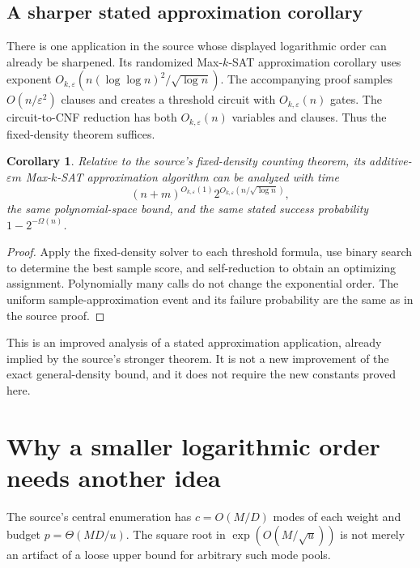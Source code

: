 \documentclass[11pt]{article}
\newtheorem{corollary}[theorem]{Corollary}
\theoremstyle{remark}
\begin{document}
\subsection{A sharper stated approximation corollary}

There is one application in the source whose displayed logarithmic order can already be sharpened. Its randomized Max-$k$-SAT approximation corollary uses exponent $O_{k,\varepsilon}(n(\log\log n)^2/\sqrt{\log n})$. The accompanying proof samples $O(n/\varepsilon^2)$ clauses and creates a threshold circuit with $O_{k,\varepsilon}(n)$ gates. The circuit-to-CNF reduction has both $O_{k,\varepsilon}(n)$ variables and clauses. Thus the fixed-density theorem suffices.

\begin{corollary}
Relative to the source's fixed-density counting theorem, its additive-$\varepsilon m$ Max-$k$-SAT approximation algorithm can be analyzed with time
\[
 (n+m)^{O_{k,\varepsilon}(1)}
 2^{O_{k,\varepsilon}(n/\sqrt{\log n})},
\]
the same polynomial-space bound, and the same stated success probability $1-2^{-\Omega(n)}$.
\end{corollary}
\begin{proof}
Apply the fixed-density solver to each threshold formula, use binary search to determine the best sample score, and self-reduction to obtain an optimizing assignment. Polynomially many calls do not change the exponential order. The uniform sample-approximation event and its failure probability are the same as in the source proof.
\end{proof}

This is an improved analysis of a stated approximation application, already implied by the source's stronger theorem. It is not a new improvement of the exact general-density bound, and it does not require the new constants proved here.

\section{Why a smaller logarithmic order needs another idea}
\label{sec:barriers}

The source's central enumeration has $c=O(M/D)$ modes of each weight and budget $p=\Theta(MD/u)$. The square root in $\exp(O(M/\sqrt u))$ is not merely an artifact of a loose upper bound for arbitrary such mode pools.
\end{document}
